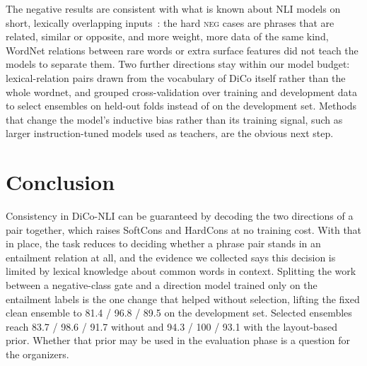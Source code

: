 \documentclass[conference]{IEEEtran}
\newcommand{\NEG}{\textsc{neg}}
\begin{document}
The negative results are consistent with what is known about NLI models on
short, lexically overlapping inputs~\cite{hans2019,glockner2018breaking}: the
hard \NEG{} cases are phrases that are related, similar or opposite, and more
weight, more data of the same kind, WordNet relations between rare words or
extra surface features did not teach the models to separate them. Two
further directions stay within our model budget: lexical-relation pairs drawn
from the vocabulary of DiCo itself rather than the whole wordnet, and grouped
cross-validation over training and development data to select ensembles on
held-out folds instead of on the development set. Methods that change the model's inductive bias rather
than its training signal, such as larger instruction-tuned models used as
teachers, are the obvious next step.

\section{Conclusion}

Consistency in DiCo-NLI can be guaranteed by decoding the two directions of a
pair together, which raises SoftCons and HardCons at no training cost. With
that in place, the task reduces to deciding whether a phrase pair stands in an
entailment relation at all, and the evidence we collected says this decision
is limited by lexical knowledge about common words in context. Splitting the
work between a negative-class gate and a direction model trained only on the
entailment labels is the one change that helped without selection, lifting the
fixed clean ensemble to 81.4 / 96.8 / 89.5 on the development set. Selected
ensembles reach 83.7 / 98.6 / 91.7 without and 94.3 / 100 / 93.1 with the
layout-based prior. Whether that prior may be used in the evaluation phase is
a question for the organizers.



\end{document}
